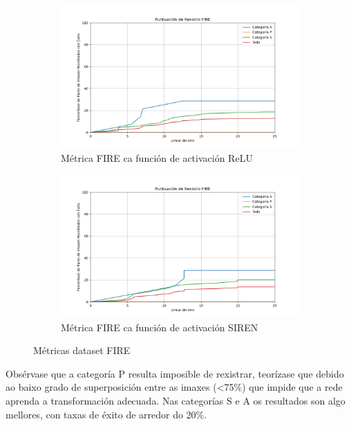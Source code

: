 \begin{figure}[ht]
    \centering
    \begin{subfigure}[b]{0.5\textwidth}
        \centering
        \includegraphics[width=\textwidth]{imaxes/FIRE_scores/fire_registration_score_ReLU.png}
        \caption{Métrica FIRE ca función de activación ReLU}
        \label{fig:FIRE_relu}
    \end{subfigure}\hfill
    \begin{subfigure}[b]{0.5\textwidth}
        \centering
        \includegraphics[width=\textwidth]{imaxes/FIRE_scores/fire_registration_scores_SIREN.png}
        \caption{Métrica FIRE ca función de activación SIREN}
        \label{fig:FIRE_SIREN}
    \end{subfigure}
    \caption{Métricas dataset FIRE}
    \label{fig:FIRE_scores}
\end{figure}

Obsérvase que a categoría P resulta imposible de rexistrar, teorízase que debido ao baixo grado de superposición entre as imaxes (<75\%) que impide que a rede aprenda a transformación adecuada.
Nas categorías S e A os resultados son algo mellores, con taxas de éxito de arredor do 20\%. 

